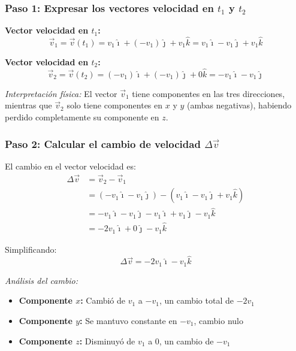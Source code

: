 \documentclass[12pt, a4paper]{article}
\begin{document}
\subsubsection*{Paso 1: Expresar los vectores velocidad en $t_1$ y $t_2$}

\textbf{Vector velocidad en $t_1$:}
\begin{equation}
\vec{v}_1 = \vec{v}(t_1) = v_1\hat{\imath} + (-v_1)\hat{\jmath} + v_1\hat{k} = v_1\hat{\imath} - v_1\hat{\jmath} + v_1\hat{k}
\end{equation}

\textbf{Vector velocidad en $t_2$:}
\begin{equation}
\vec{v}_2 = \vec{v}(t_2) = (-v_1)\hat{\imath} + (-v_1)\hat{\jmath} + 0\hat{k} = -v_1\hat{\imath} - v_1\hat{\jmath}
\end{equation}

\textit{Interpretación física:} El vector $\vec{v}_1$ tiene componentes en las tres direcciones, mientras que $\vec{v}_2$ solo tiene componentes en $x$ y $y$ (ambas negativas), habiendo perdido completamente su componente en $z$.

\subsubsection*{Paso 2: Calcular el cambio de velocidad $\Delta \vec{v}$}

El cambio en el vector velocidad es:
\begin{align*}
\Delta \vec{v} &= \vec{v}_2 - \vec{v}_1 \\
&= (-v_1\hat{\imath} - v_1\hat{\jmath}) - (v_1\hat{\imath} - v_1\hat{\jmath} + v_1\hat{k}) \\
&= -v_1\hat{\imath} - v_1\hat{\jmath} - v_1\hat{\imath} + v_1\hat{\jmath} - v_1\hat{k} \\
&= -2v_1\hat{\imath} + 0\hat{\jmath} - v_1\hat{k}
\end{align*}

Simplificando:
\begin{equation}
\Delta \vec{v} = -2v_1\hat{\imath} - v_1\hat{k}
\end{equation}

\textit{Análisis del cambio:}
\begin{itemize}
    \item \textbf{Componente $x$:} Cambió de $v_1$ a $-v_1$, un cambio total de $-2v_1$
    \item \textbf{Componente $y$:} Se mantuvo constante en $-v_1$, cambio nulo
    \item \textbf{Componente $z$:} Disminuyó de $v_1$ a $0$, un cambio de $-v_1$
\end{itemize}
\end{document}
